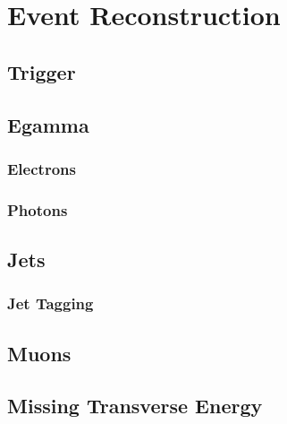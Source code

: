 \chapter{Event Reconstruction}

\section{Trigger}
\section{Egamma}
\subsection{Electrons}
\subsection{Photons} %
\section{Jets}
\subsection{Jet Tagging}
\section{Muons}
\section{Missing Transverse Energy}

